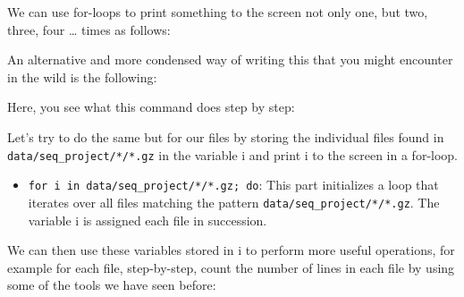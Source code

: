 \documentclass[
  letterpaper,
  DIV=11,
  numbers=noendperiod]{scrreprt}
\newenvironment{Shaded}{}{}
\newcommand{\BuiltInTok}[1]{\textcolor[rgb]{0.84,0.23,0.29}{#1}}
\newcommand{\ControlFlowTok}[1]{\textcolor[rgb]{0.84,0.23,0.29}{#1}}
\newcommand{\KeywordTok}[1]{\textcolor[rgb]{0.84,0.23,0.29}{#1}}
\newcommand{\NormalTok}[1]{\textcolor[rgb]{0.14,0.16,0.18}{#1}}
\newcommand{\PreprocessorTok}[1]{\textcolor[rgb]{0.84,0.23,0.29}{#1}}
\newcommand{\StringTok}[1]{\textcolor[rgb]{0.01,0.18,0.38}{#1}}
\newcommand{\VariableTok}[1]{\textcolor[rgb]{0.89,0.38,0.04}{#1}}
\providecommand{\tightlist}{%
  \setlength{\itemsep}{0pt}\setlength{\parskip}{0pt}}\usepackage{longtable,booktabs,array}
\begin{document}
We can use for-loops to print something to the screen not only one, but
two, three, four \ldots{} times as follows:

\begin{Shaded}
\end{Shaded}

An alternative and more condensed way of writing this that you might
encounter in the wild is the following:

\begin{Shaded}
\end{Shaded}

Here, you see what this command does step by step:

Let's try to do the same but for our files by storing the individual
files found in \texttt{data/seq\_project/*/*.gz} in the variable i and
print i to the screen in a for-loop.

\begin{Shaded}
\end{Shaded}

\begin{itemize}
\tightlist
\item
  \texttt{for\ i\ in\ data/seq\_project/*/*.gz;\ do}: This part
  initializes a loop that iterates over all files matching the pattern
  \texttt{data/seq\_project/*/*.gz}. The variable i is assigned each
  file in succession.
\end{itemize}

We can then use these variables stored in i to perform more useful
operations, for example for each file, step-by-step, count the number of
lines in each file by using some of the tools we have seen before:
\end{document}
